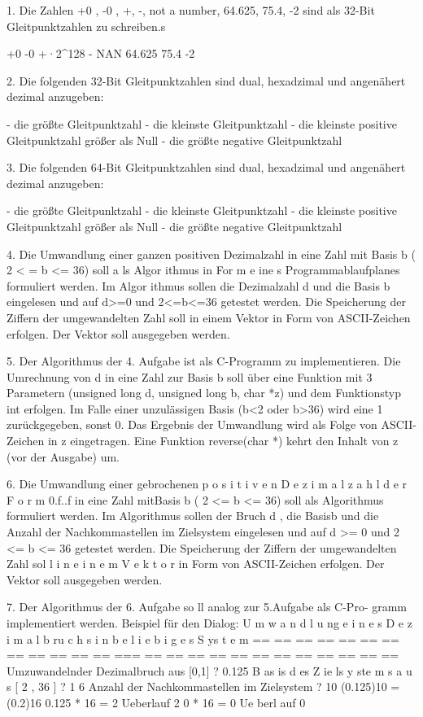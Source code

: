 1. Die Zahlen +0 , -0 , +\infty , -\infty, not a number, 64.625, 75.4, -2 sind als 32-Bit Gleitpunktzahlen zu schreiben.s

    +0
    -0
    +·2^128
    -\infty 
    NAN
    64.625
    75.4
    -2
    

2. Die folgenden 32-Bit Gleitpunktzahlen sind dual, hexadzimal und angenähert dezimal anzugeben:

- die größte Gleitpunktzahl
- die kleinste Gleitpunktzahl
- die kleinste positive Gleitpunktzahl größer als Null
- die größte negative Gleitpunktzahl

3. Die folgenden 64-Bit Gleitpunktzahlen sind dual, hexadzimal und angenähert dezimal anzugeben:

- die größte Gleitpunktzahl
- die kleinste Gleitpunktzahl
- die kleinste positive Gleitpunktzahl größer als Null
- die größte negative Gleitpunktzahl

4. Die Umwandlung einer ganzen positiven Dezimalzahl in eine Zahl mit Basis b ( 2 < = b <= 36) soll a ls Algor ithmus in For m e ine s Programmablaufplanes formuliert werden. Im Algor ithmus sollen die Dezimalzahl d und die Basis b eingelesen und auf d>=0 und 2<=b<=36
getestet werden. Die Speicherung der Ziffern der umgewandelten Zahl soll in einem Vektor in Form von ASCII-Zeichen erfolgen. Der Vektor soll ausgegeben werden.

5. Der Algorithmus der 4. Aufgabe ist als C-Programm zu implementieren. Die Umrechnung von d in eine Zahl zur Basis b soll über eine Funktion mit 3 Parametern (unsigned long d, unsigned long b, char *z) und dem Funktionstyp int erfolgen. Im Falle einer unzulässigen Basis (b<2 oder b>36) wird eine 1 zurückgegeben, sonst 0. Das Ergebnis der Umwandlung wird als Folge von ASCII-Zeichen in z eingetragen. Eine Funktion
reverse(char *) kehrt den Inhalt von z (vor der Ausgabe) um.

6. Die Umwandlung einer gebrochenen p o s i t i v e n D e z i m a l z a h l d e r F o r m
0.f..f in eine Zahl mitBasis b ( 2 <= b <= 36) soll als Algorithmus
formuliert werden. Im Algorithmus sollen der Bruch d , die Basisb und
die Anzahl der Nachkommastellen im Zielsystem eingelesen und auf
d >= 0 und 2 <= b <= 36 getestet werden. Die Speicherung der Ziffern
der umgewandelten Zahl sol l i n e i n e m V e k t o r in Form von ASCII-Zeichen
erfolgen. Der Vektor soll ausgegeben werden.

7. Der Algorithmus der 6. Aufgabe so ll analog zur 5.Aufgabe als C-Pro-
gramm implementiert werden. Beispiel für den Dialog:
U m w a n d l u ng e i n e s D e z i m a l b ru c h s i n b e l i e b i g e s S ys t e m
== == == == == == == == == == == == === == == == == == == == == == == == ==
Umzuwandelnder Dezimalbruch aus [0,1] ? 0.125
B as is d es Z ie ls y ste m s a u s [ 2 , 36 ] ? 1 6
Anzahl der Nachkommastellen im Zielsystem ? 10
(0.125)10 = (0.2)16
0.125 * 16 =
2 Ueberlauf 2
0 * 16 =
0 Ue berl auf 0
